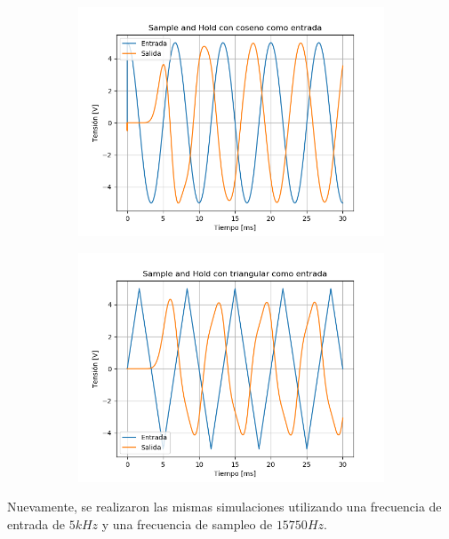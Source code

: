 \begin{figure}[H]
	\begin{subfigure}{.5\textwidth}
	\centering
	\includegraphics[width=\textwidth]{ImagenesEjercicio6/SH - Cos.png}
	\end{subfigure}
	\begin{subfigure}{.5\textwidth}
	\centering
	\includegraphics[width=\textwidth]{ImagenesEjercicio6/SH - Tri.png}
	\end{subfigure}
\end{figure}

Nuevamente, se realizaron las mismas simulaciones utilizando una frecuencia de entrada de $5kHz$ y una frecuencia de sampleo de $15750Hz$.

